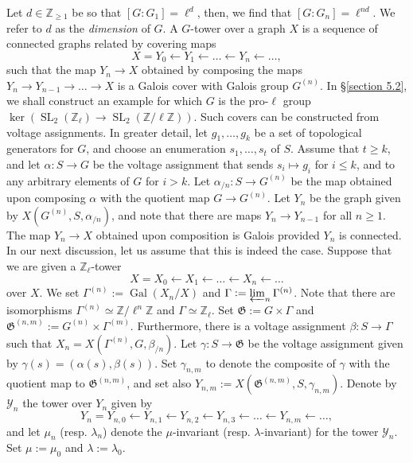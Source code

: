 \documentclass[11pt]{amsart}
\numberwithin{equation}{section}
\theoremstyle{remark}
\newcommand{\G}{\mathfrak{G}}
\newcommand{\Z}{\mathbb{Z}}
\newcommand{\cY}{\mathcal{Y}}
\newcommand{\DV}[1]{\textcolor{blue}{#1}}
\newcommand{\op}[1]{\operatorname{#1}}
\begin{document}
Let $d\in \Z_{\geq 1}$ be so that $[G:G_1]=\ell^d$, then, we find that $[G:G_n]=\ell^{nd}$. We refer to $d$ as the \emph{dimension} of $G$. A $G$-tower over a graph $X$ is a sequence of connected graphs related by covering maps 
\begin{equation} 
X = Y_0 \leftarrow Y_1\leftarrow \ldots \leftarrow Y_n \leftarrow \ldots,
\end{equation}
such that the map $Y_n\rightarrow X$ obtained by composing the maps $Y_n\rightarrow Y_{n-1}\rightarrow \dots \rightarrow X$ is a Galois cover with Galois group $G^{(n)}$. In \S \ref{section 5.2}, we shall construct an example for which $G$ is the pro-$\ell$ group $\op{ker}\left(\op{SL}_2(\Z_\ell)\rightarrow \op{SL}_2(\Z/\ell \Z)\right)$. Such covers can be constructed from voltage assignments. In greater detail, let $g_1, \dots, g_k$ be a set of topological generators for $G$, and choose an enumeration $s_1, \dots, s_t$ of $S$. Assume that $t\geq k$, and let $\alpha:S\rightarrow G$ be the voltage assignment that sends $s_i\mapsto g_i$ for $i\leq k$, and to any arbitrary elements of $G$ for $i>k$. Let $\alpha_{/n}:S\rightarrow G^{(n)}$ be the map obtained upon composing $\alpha$ with the quotient map $G\rightarrow G^{(n)}$. Let $Y_n$ be the graph given by $X(G^{(n)}, S, \alpha_{/n})$, and note that there are maps $Y_n\rightarrow Y_{n-1}$ for all $n\geq 1$. The map $Y_n\rightarrow X$ obtained upon composition is Galois provided $Y_n$ is connected. In our next discussion, let us assume that this is indeed the case. %
Suppose that we are given a $\Z_\ell$-tower
\begin{equation}\label{X tower last}X=X_0\leftarrow X_1\leftarrow \dots \leftarrow X_n\leftarrow \dots\end{equation} over $X$. We set $\Gamma^{(n)}:=\op{Gal}(X_n/X)$ and $\Gamma:=\varprojlim_n \Gamma^{(n)}$. Note that there are isomorphisms $\Gamma^{(n)}\simeq \Z/\ell^n\Z$ and $\Gamma\simeq  \Z_\ell$. Set $\G:=G\times \Gamma$ and $\G^{(n, m)}:=G^{(n)}\times \Gamma^{(m)}$. Furthermore, there is a voltage assignment $\beta:S\rightarrow \Gamma$ such that $X_n=X(\Gamma^{(n)}, G, \beta_{/n})$. Let $\gamma:S\rightarrow \G$ be the voltage assignment given by $\gamma(s)=(\alpha(s), \beta(s))$. Set $\gamma_{n,m}$ to denote the composite of $\gamma$ with the quotient map to $\G^{(n, m)}$, and set also $Y_{n,m}:=X(\G^{(n, m)}, S, \gamma_{n,m})$. Denote by $\cY_n$ the tower over $Y_n$ given by
\[Y_n=Y_{n,0}\leftarrow Y_{n,1}\leftarrow Y_{n, 2}\leftarrow Y_{n,3}\leftarrow \dots \leftarrow Y_{n,m}\leftarrow \dots,\]
and let $\mu_n$ (resp. $\lambda_n$) denote the $\mu$-invariant (resp. $\lambda$-invariant) for the tower $\cY_n$. Set $\mu:=\mu_0$ and $\lambda:=\lambda_0$. 
\end{document}
